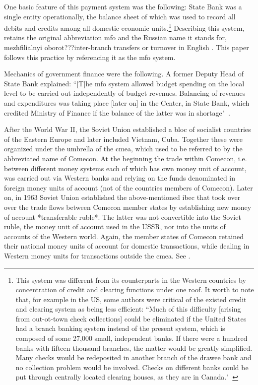 One basic feature of this payment system was the following: State Bank was a single entity operationally, the balance sheet of which was used to record all debits and credits among all domestic economic units.\footnote{This system was different from its counterparts in the Western countries by concentration of credit and clearing functions under one roof. It worth to note that, for example in the US, some authors were critical of the existed credit and clearing system as being less efficient: ``Much of this difficulty [arising from out-ot-town check collections] could be eliminated if the United States had a branch banking system instead of the present system, which is composed of some 27,000 small, independent banks. If there were a hundred banks with fifteen thousand branches, the matter would be greatly simplified. Many checks would be redeposited in another branch of the drawee bank and no collection problem would be involved. Checks on different banks could be put through centrally located clearing houses, as they are in Canada."~\citep[p.~19]{patterson1918}} Describing this system, \citeauthor{woodruff1999} retains the original abbreviation \ac{mfo} and the Russian name it stands for, mezhfilialnyi oborot???inter-branch transfers or turnover in English \citep[pp.~66-67]{woodruff1999}. This paper follows this practice by referencing it as the \ac{mfo} system.

Mechanics of government finance were the following. A former Deputy Head
of State Bank explained: ``[T]he \ac{mfo} system allowed budget spending on
the local level to be carried out independently of budget revenues.
Balancing of revenues and expenditures was taking place [later on] in
the Center, in State Bank, which credited Ministry of Finance if the
balance of the latter was in shortage"~\citep[p.~16]{krotov2008b}.

After the World War II, the Soviet Union established a bloc of socialist
countries of the Eastern Europe and later included Vietnam, Cuba.
Together these were organized under the umbrella of the \acf{cmea}, which used to be referred to by the abbreviated name of Comecon. At the beginning the trade within Comecon,
i.e. between different money systems each of which has own money unit of
account, was carried out via Western banks and relying on the funds
denominated in foreign money units of account (not of the countries
members of Comecon). Later on, in 1963 Soviet Union established the
above-mentioned \ac{ibec} that took over over the trade flows between Comecon
member states by establishing new money of account *transferable
ruble*. The latter was not convertible into the Soviet ruble, the money
unit of account used in the USSR, nor into the units of accounts of the
Western world. Again, the member states of Comecon retained their
national money units of account for domestic transactions, while dealing
in Western money units for transactions outside the \ac{cmea}. See \citep{vincze,kalinski}.

